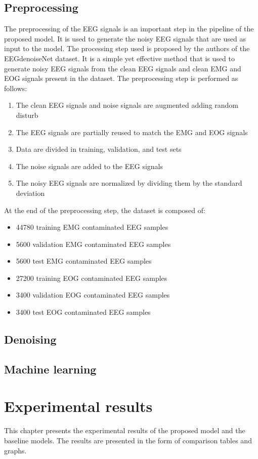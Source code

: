 \documentclass[a4paper]{sapthesis}
\begin{document}
\section{Preprocessing}
The preprocessing of the EEG signals is an important step in the
pipeline of the proposed model. It is used to generate the noisy EEG
signals that are used as input to the model.
The processing step used is proposed by the authors of the EEGdenoiseNet
dataset\cite{EEGdenoiseNet}. It is a simple yet effective method that
is used to generate noisy EEG signals from the clean EEG signals and clean 
EMG and EOG signals present in the dataset.
The preprocessing step is performed as follows:
\begin{enumerate}
\item The clean EEG signals and noise signals are augmented adding 
random disturb
\item The EEG signals are partially reused to match the EMG and EOG
signals
\item Data are divided in training, validation, and test sets
\item The noise signals are added to the EEG signals
\item The noisy EEG signals are normalized by dividing them by the
standard deviation
\end{enumerate}
At the end of the preprocessing step, the dataset is composed of:
\begin{itemize}
\item 44780 training EMG contaminated EEG samples
\item 5600 validation EMG contaminated EEG samples
\item 5600 test EMG contaminated EEG samples
\item 27200 training EOG contaminated EEG samples
\item 3400 validation EOG contaminated EEG samples
\item 3400 test EOG contaminated EEG samples
\end{itemize}
\section{Denoising}
\section{Machine learning}
\chapter{Experimental results}
This chapter presents the experimental results of the proposed model and
the baseline models. The results are presented in the form of comparison tables
and graphs. 
\end{document}
